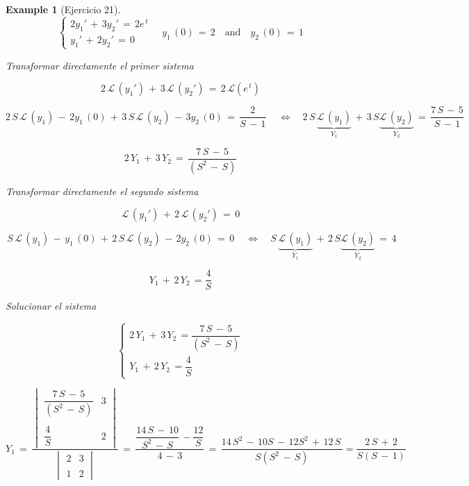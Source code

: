 \documentclass[a4paper,11pt,openany]{book}
\newtheorem{exmp}{Example}[section]
\begin{document}
\begin{exmp}[Ejercicio 21]


    $$
\left\{
\begin{array}{lll}
2y_{1}'\,+\,3y_{2}'\,=\,2e^{\,t} \\
y_{1}'\,+\,2y_{2}'\,=\,0
\end{array}
\right.
\quad y_{1}\,(0)\,=\,2 \quad \text{and} \quad y_{2}\,(0)\,=\,1$$

Transformar directamente el primer sistema

$$ 2\,\mathcal{L}\,\left(y_{1}' \right)\,+\,3\,\mathcal{L}\,\left(y_{2}' \right)\,=\,2\,\mathcal{L}\left(e^{\,t}\right)$$

$$2\,S\,\mathcal{L}\,\left(y_{1} \right)\,-\,2y_{1}\,(0)\,+\,3\,S\,\mathcal{L}\,\left(y_{2} \right)\,-\,3y_{2}\,(0)\,=\,\dfrac{2}{S\,-\,1}\,\quad \iff \quad 2\,S\,\underbrace{\mathcal{L}\,\left(y_{1} \right)}_{Y_{1}  }\,+\,3\,S\underbrace{\mathcal{L}\,\left(y_{2} \right)}_{Y_{2 } }\,=\,\dfrac{7\,S\,-\,5}{S\,-\,1} $$

$$\boxed{2\,Y_{1}\,+\,3\,Y_{2}\,=\,\dfrac{7\,S\,-\,5}{ (S^{2}\,-\,S)} }$$

Transformar directamente el segundo sistema

$$\mathcal{L}\,\left(y_{1}' \right)\,+\,2\,\mathcal{L}\,\left(y_{2}' \right)\,=\,0$$

$$\,S\,\mathcal{L}\,\left(y_{1} \right)\,-\,y_{1}\,(0)\,+\,2\,S\,\mathcal{L}\,\left(y_{2} \right)\,-\,2y_{2}\,(0)\,=\,0\,\quad \iff \quad S\,\underbrace{\mathcal{L}\,\left(y_{1} \right)}_{Y_{1}  }\,+\,2\,S\underbrace{\mathcal{L}\,\left(y_{2} \right)}_{Y_{2 } }\,=\,4 $$

$$\boxed{Y_{1}\,+\,2\,Y_{2}\,= \dfrac{4}{S} }$$

Solucionar el sistema

$$\begin{cases}
2\,Y_{1}\,+\,3\,Y_{2}\,=\dfrac{7\,S\,-\,5}{ (S^{2}\,-\,S)}
\\
Y_{1}\,+\,2\,Y_{2}\,= \dfrac{4}{S} 
\end{cases}$$

$$Y_{1}\,=\,\dfrac{\begin{vmatrix}
\dfrac{7\,S\,-\,5}{ (S^{2}\,-\,S)} & 3 \\
\\
\dfrac{4}{S}  & 2
\end{vmatrix} }{\begin{vmatrix}
2 & 3 \\
\\
1 & 2
\end{vmatrix} }\,=\,\dfrac{\dfrac{14\,S\,-\,10}{S^{2}\,-\,S}\,-\dfrac{12}{S} }{4\,-\,3} \,=\,\dfrac{14\,S^{2}\,-\,10S\,-\,12S^{2}\,+\,12\,S\,}{S(S^{2}\,-\,S)} = \dfrac{2\,S\,+\,2}{S(S\,-\,1)}  $$


\end{exmp}
\end{document}
